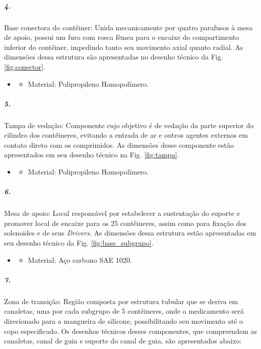    
    \subparagraph*{4.}\label{retorno_conector}
    Base conectora do contêiner: Unida mecanicamente por quatro parafusos à mesa de apoio, possui um furo com rosca fêmea para o encaixe do compartimento inferior do contêiner, impedindo tanto seu movimento axial quanto radial. As dimensões dessa estrutura são apresentadas no desenho técnico da  Fig. \ref{fig:conector}.
    
    \begin{itemize}
   \item[]
   \begin{itemize}
       \item  Material: Polipropileno Homopolímero.
   \end{itemize}
   \end{itemize}
         
     
     \subparagraph*{5.}\label{retorno_tampa}
     Tampa de vedação: Componente cujo objetivo é de vedação da parte superior do cilindro dos contêineres, evitando a entrada de ar e outros agentes externos em contato direto com os comprimidos. As dimensões desse componente estão apresentados em seu desenho técnico na Fig. \ref{fig:tampa}.
     
     \begin{itemize}
   \item[]
   \begin{itemize}
       \item  Material: Polipropileno Homopolímero.
   \end{itemize}
   \end{itemize}
      
    

\subparagraph*{6.}\label{retorno_base_subgrupo}
Mesa de apoio: Local responsável por estabelecer a sustentação do suporte e promover local de encaixe para os 25 contêineres, assim como para fixação dos solenoides e de seus \textit{Drivers}. As dimensões dessa estrutura estão apresentadas em seu desenho técnico da Fig. \ref{fig:base_subgrupo}.

\begin{itemize}
   \item[]
   \begin{itemize}
       \item  Material: Aço carbono SAE 1020.
   \end{itemize}
   \end{itemize}
 

\subparagraph*{7.}\label{retorno_zonadetransição}
Zona de transição: Região composta por estrutura tubular que se deriva em canaletas, uma por cada subgrupo de 5 contêineres, onde o medicamento será direcionado para a mangueira de silicone, possibilitando seu movimento até o copo especificado. Os desenhos técnicos desses componentes, que compreendem as canaletas, canal de guia e suporte do canal de guia, são apresentados abaixo:

